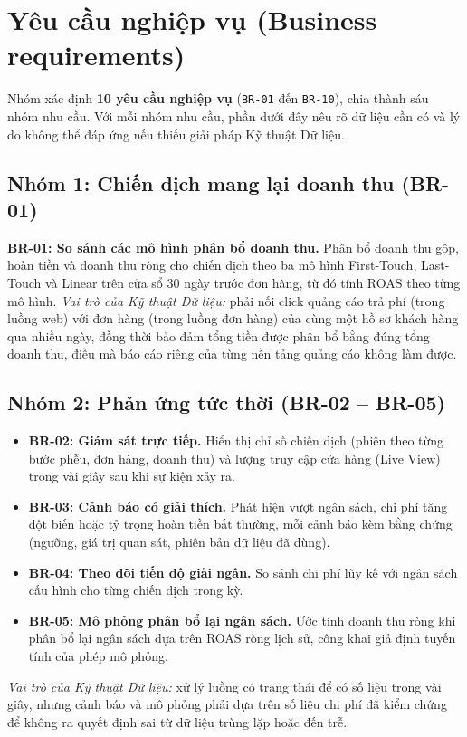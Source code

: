 \section{Yêu cầu nghiệp vụ (Business requirements)}
\label{sec:c1-business-requirements}

Nhóm xác định \textbf{10 yêu cầu nghiệp vụ} (\texttt{BR-01} đến \texttt{BR-10}), chia thành sáu nhóm nhu cầu. Với mỗi nhóm nhu cầu, phần dưới đây nêu rõ dữ liệu cần có và lý do không thể đáp ứng nếu thiếu giải pháp Kỹ thuật Dữ liệu.

\subsection{Nhóm 1: Chiến dịch mang lại doanh thu (BR-01)}
\label{sec:c1-br-group1}
\textbf{BR-01: So sánh các mô hình phân bổ doanh thu.} Phân bổ doanh thu gộp, hoàn tiền và doanh thu ròng cho chiến dịch theo ba mô hình First-Touch, Last-Touch và Linear trên cửa sổ 30 ngày trước đơn hàng, từ đó tính ROAS theo từng mô hình. \emph{Vai trò của Kỹ thuật Dữ liệu:} phải nối click quảng cáo trả phí (trong luồng web) với đơn hàng (trong luồng đơn hàng) của cùng một hồ sơ khách hàng qua nhiều ngày, đồng thời bảo đảm tổng tiền được phân bổ bằng đúng tổng doanh thu, điều mà báo cáo riêng của từng nền tảng quảng cáo không làm được.

\subsection{Nhóm 2: Phản ứng tức thời (BR-02 -- BR-05)}
\label{sec:c1-br-group2}
\begin{itemize}
    \item \textbf{BR-02: Giám sát trực tiếp.} Hiển thị chỉ số chiến dịch (phiên theo từng bước phễu, đơn hàng, doanh thu) và lượng truy cập cửa hàng (Live View) trong vài giây sau khi sự kiện xảy ra.
    \item \textbf{BR-03: Cảnh báo có giải thích.} Phát hiện vượt ngân sách, chi phí tăng đột biến hoặc tỷ trọng hoàn tiền bất thường, mỗi cảnh báo kèm bằng chứng (ngưỡng, giá trị quan sát, phiên bản dữ liệu đã dùng).
    \item \textbf{BR-04: Theo dõi tiến độ giải ngân.} So sánh chi phí lũy kế với ngân sách cấu hình cho từng chiến dịch trong kỳ.
    \item \textbf{BR-05: Mô phỏng phân bổ lại ngân sách.} Ước tính doanh thu ròng khi phân bổ lại ngân sách dựa trên ROAS ròng lịch sử, công khai giả định tuyến tính của phép mô phỏng.
\end{itemize}
\emph{Vai trò của Kỹ thuật Dữ liệu:} xử lý luồng có trạng thái để có số liệu trong vài giây, nhưng cảnh báo và mô phỏng phải dựa trên số liệu chi phí đã kiểm chứng để không ra quyết định sai từ dữ liệu trùng lặp hoặc đến trễ.

